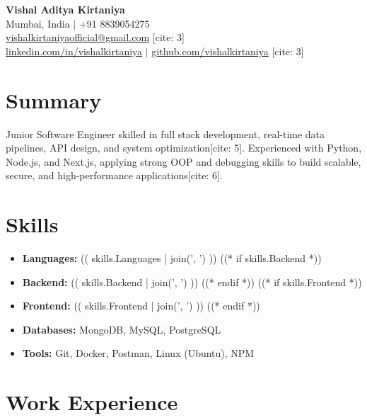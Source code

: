 \documentclass[11pt,a4paper]{article}
\begin{document}
\begin{center}
    {\Huge \textbf{Vishal Aditya Kirtaniya}} \\ \vspace{4pt}
    \small
    Mumbai, India $|$ +91 8839054275 \\
    \href{mailto:vishalkirtaniyaofficial@gmail.com}{vishalkirtaniyaofficial@gmail.com} [cite: 3] \\
    \href{https://linkedin.com/in/vishalkirtaniya}{linkedin.com/in/vishalkirtaniya} $|$
    \href{https://github.com/vishalkirtaniya}{github.com/vishalkirtaniya} [cite: 3]
\end{center}

\section*{Summary}
Junior Software Engineer skilled in full stack development, real-time data pipelines, 
API design, and system optimization[cite: 5]. Experienced with Python, Node.js, and Next.js, 
applying strong OOP and debugging skills to build scalable, secure, and high-performance applications[cite: 6].

\section*{Skills}
\begin{itemize}[label={}]
    \item \textbf{Languages:} (( skills.Languages | join(', ') ))
    ((* if skills.Backend *)) \item \textbf{Backend:} (( skills.Backend | join(', ') )) ((* endif *))
    ((* if skills.Frontend *)) \item \textbf{Frontend:} (( skills.Frontend | join(', ') )) ((* endif *))
    \item \textbf{Databases:} MongoDB, MySQL, PostgreSQL
    \item \textbf{Tools:} Git, Docker, Postman, Linux (Ubuntu), NPM
\end{itemize}

\section*{Work Experience}
\end{document}
